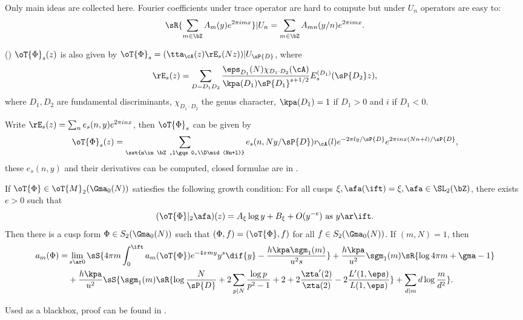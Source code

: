 \documentclass[a4paper, twoside]{article}
\begin{document}
\begin{prf}
	Only main ideas are collected here. Fourier coefficients under trace operator are hard to compute but under $U_{n}$ operators are easy to:
	\[
		\sR{\sum_{m\in\bZ}A_{m}(y)e^{2\pi imx}}|U_{n}=\sum_{m\in\bZ}A_{mn}(y/n)e^{2\pi imx}.
	\]


	(\cite[IV.2.4]{GZ1986}) $\oT{\Phi}_{s}(z)$ is also given by $\oT{\Phi}_{s}=(\tta_{\cA}(z)\rE_{s}(Nz))|U_{\sP{D}}$, where
	\[
		\rE_{s}(z)=\sum_{D=D_{1}D_{2}}\frac{\eps_{D_{1}}(N)\chi_{D_{1}\cdot D_{2}}(\cA)}{\kpa(D_{1})\sP{D_{1}}^{s+1/2}}E_{s}^{(D_{1})}(\sP{D_{2}}z),
	\]
	where $D_{1},D_{2}$ are fundamental discriminants, $\chi_{D_{1}\cdot D_{2}}$ the genus character, $\kpa(D_{1})=1$ if $D_{1}>0$ and $i$ if $D_{1}<0$.

	Write $\rE_{s}(z)=\sum_{n}e_{s}(n,y)e^{2\pi inx}$, then $\oT{\Phi}_{s}$ can be given by
	\[
		\oT{\Phi}_{s}(z)=\sum_{\sst{n\in\bZ,l\gqs0,\\D\mid(Nn+l)}}e_{s}(n,Ny/\sP{D})r_{\cA}(l)e^{-2\pi ly/\sP{D}}e^{2\pi inx (Nn+l)/\sP{D}},
	\]
	these $e_{s}(n,y)$ and their derivatives can be computed, closed formulae are in \cite[IV.3.2, IV.3.3]{GZ1986}.
\end{prf}

\begin{thm}[{\cite[IV.6.2, IV.6.7, IV.6.8]{GZ1986}}]\label{thm:Sturm}
	If $\oT{\Phi}\in\oT{M}_{2}(\Gma_{0}(N))$ satiesfies the following growth condition: For all cusps $\xi, \afa(\ift)=\xi, \afa\in\SL_{2}(\bZ)$, there exists $e>0$ such that
	\[
		(\oT{\Phi}|_{2}\afa)(z)=A_{\xi}\log y+B_{\xi}+O(y^{-e})\text{ as $y\ar\ift$}.
	\]
	Then there is a cusp form $\Phi\in S_{2}(\Gma_{0}(N))$ such that $(\Phi,f)=(\oT{\Phi},f)$ for all $f\in S_{2}(\Gma_{0}(N))$. If $(m,N)=1$, then
	\begin{align*}
	  a_{m}(\Phi)=&\lim_{s\ar 0}\sS{4\pi m\int_{0}^{\ift}a_{m}(\oT{\Phi})e^{-4\pi my}y^{s}\dif{y}-\frac{h\kpa\sgm_{1}(m)}{u^{2}s}}+\frac{h\kpa}{u^{2}}\sgm_{1}(m)\sR{\log{4\pi m}+\gma-1}\\
			   &+\frac{h\kpa}{u^{2}}\sS{\sgm_{1}(m)\sR{\log\frac{N}{\sP{D}}+2\sum_{p\mid N}\frac{\log p}{p^{2}-1}+2+2\frac{\zta'(2)}{\zta(2)}-2\frac{L'(1,\eps)}{L(1,\eps)}}+\sum_{d\mid m}d\log\frac{m}{d^{2}}}. \\
	\end{align*}
\end{thm}

\begin{rmk}
	Used as a blackbox, proof can be found in \cite[Page~296-300]{GZ1986}.
\end{rmk}
\end{document}
